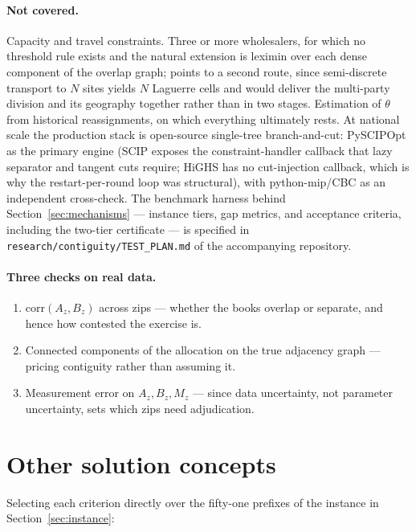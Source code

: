 \documentclass[11pt]{article}
\theoremstyle{remark}\newtheorem*{remark}{Remark}
\begin{document}
\paragraph{Not covered.} Capacity and travel constraints. Three or more wholesalers, for
which no threshold rule exists and the natural extension is leximin over each dense
component of the overlap graph; \citet{warren2025} points to a second route, since
semi-discrete transport to $N$ sites yields $N$ Laguerre cells and would deliver the
multi-party division and its geography together rather than in two stages. Estimation of $\theta$ from historical reassignments,
on which everything ultimately rests. At national scale the production stack is
open-source single-tree branch-and-cut: PySCIPOpt as the primary engine (SCIP exposes
the constraint-handler callback that lazy separator and tangent cuts require; HiGHS has
no cut-injection callback, which is why the restart-per-round loop was structural), with
python-mip/CBC as an independent cross-check. The benchmark harness behind
Section~\ref{sec:mechanisms} --- instance tiers, gap metrics, and acceptance criteria,
including the two-tier certificate --- is specified in
\texttt{research/contiguity/TEST\_PLAN.md} of the accompanying repository.

\paragraph{Three checks on real data.}
\begin{enumerate}[leftmargin=*,itemsep=2pt]
\item $\mathrm{corr}(A_z,B_z)$ across zips --- whether the books overlap or separate,
and hence how contested the exercise is.
\item Connected components of the allocation on the true adjacency graph --- pricing
contiguity rather than assuming it.
\item Measurement error on $A_z,B_z,M_z$ --- since data uncertainty, not parameter
uncertainty, sets which zips need adjudication.
\end{enumerate}

\appendix
\section{Other solution concepts}\label{app:other}
Selecting each criterion directly over the fifty-one prefixes of the instance in
Section~\ref{sec:instance}:
\end{document}
